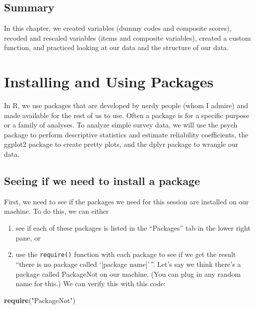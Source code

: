 \documentclass[
]{article}
\newenvironment{Shaded}{\begin{snugshade}}{\end{snugshade}}
\newcommand{\KeywordTok}[1]{\textcolor[rgb]{0.13,0.29,0.53}{\textbf{#1}}}
\newcommand{\NormalTok}[1]{#1}
\newcommand{\StringTok}[1]{\textcolor[rgb]{0.31,0.60,0.02}{#1}}
\providecommand{\tightlist}{%
  \setlength{\itemsep}{0pt}\setlength{\parskip}{0pt}}
\begin{document}
\hypertarget{summary}{%
\subsection{Summary}\label{summary}}

In this chapter, we created variables (dummy codes and composite scores), recoded and rescaled variables (items and composite variables), created a custom function, and practiced looking at our data and the structure of our data.

\hypertarget{Packages}{%
\section{Installing and Using Packages}\label{Packages}}

In R, we use packages that are developed by nerdy people (whom I admire) and made available for the rest of us to use. Often a package is for a specific purpose or a family of analyses. To analyze simple survey data, we will use the psych package \citep{R-psych} to perform descriptive statistics and estimate reliability coefficients, the ggplot2 package \citep{R-ggplot2} to create pretty plots, and the dplyr \citep{R-dplyr} package to wrangle our data.

\hypertarget{seeing-if-we-need-to-install-a-package}{%
\subsection{Seeing if we need to install a package}\label{seeing-if-we-need-to-install-a-package}}

First, we need to see if the packages we need for this session are installed on our machine. To do this, we can either

\begin{enumerate}
\def\labelenumi{\arabic{enumi}.}
\tightlist
\item
  see if each of these packages is listed in the ``Packages'' tab in the lower right pane, or
\item
  use the \texttt{require()} function with each package to see if we get the result ``there is no package called `{[}package name{]}'\,''. Let's say we think there's a package called PackageNot on our machine. (You can plug in any random name for this.) We can verify this with this code:
\end{enumerate}

\begin{Shaded}
\begin{Highlighting}[]
\KeywordTok{require}\NormalTok{(}\StringTok{"PackageNot"}\NormalTok{)}
\end{Highlighting}
\end{Shaded}
\end{document}
